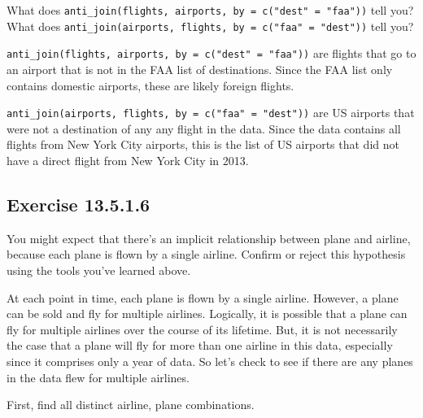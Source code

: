 \documentclass[]{book}
\newenvironment{Shaded}{\begin{snugshade}}{\end{snugshade}}
\newcommand{\KeywordTok}[1]{\textcolor[rgb]{0.13,0.29,0.53}{\textbf{#1}}}
\newcommand{\NormalTok}[1]{#1}
\newcommand{\OperatorTok}[1]{\textcolor[rgb]{0.81,0.36,0.00}{\textbf{#1}}}
\newcommand{\StringTok}[1]{\textcolor[rgb]{0.31,0.60,0.02}{#1}}
\theoremstyle{plain}
\theoremstyle{remark}
\begin{document}
What does \texttt{anti\_join(flights,\ airports,\ by\ =\ c("dest"\ =\ "faa"))} tell you? What does \texttt{anti\_join(airports,\ flights,\ by\ =\ c("faa"\ =\ "dest"))} tell you?

\texttt{anti\_join(flights,\ airports,\ by\ =\ c("dest"\ =\ "faa"))} are flights that go to an airport that is not in the FAA list of destinations. Since the FAA list only contains
domestic airports, these are likely foreign flights.

\texttt{anti\_join(airports,\ flights,\ by\ =\ c("faa"\ =\ "dest"))} are US airports that were not a destination of any any flight in the data.
Since the data contains all flights from New York City airports, this is the list of
US airports that did not have a direct flight from New York City in 2013.

\hypertarget{exercise-13.5.1.6}{%
\subsection*{\texorpdfstring{Exercise {13.5.1.6}}{Exercise 13.5.1.6}}\label{exercise-13.5.1.6}}

You might expect that there's an implicit relationship between plane and airline, because each plane is flown by a single airline. Confirm or reject this hypothesis using the tools you've learned above.

At each point in time, each plane is flown by a single airline.
However, a plane can be sold and fly for multiple airlines.
Logically, it is possible that a plane can fly for multiple airlines over the course of its lifetime.
But, it is not necessarily the case that a plane will fly for more than one airline in this data, especially since it comprises only a year of data.
So let's check to see if there are any planes in the data flew for multiple airlines.

First, find all distinct airline, plane combinations.

\begin{Shaded}
\end{Shaded}
\end{document}
